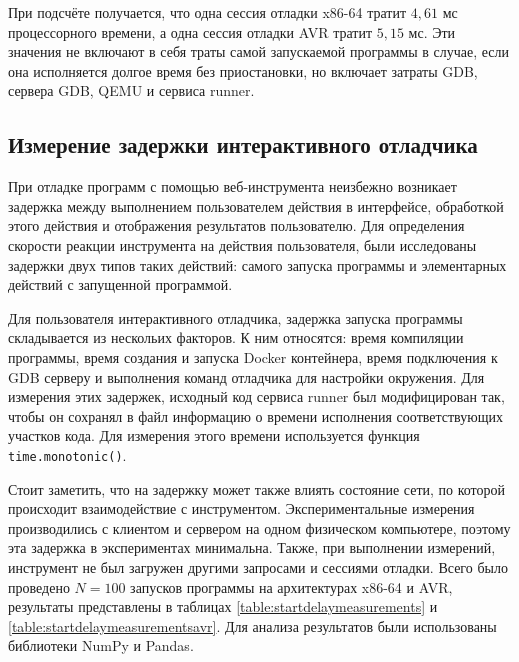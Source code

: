 \documentclass[a4paper,article,14pt]{extarticle}
\begin{document}
При подсчёте получается, что одна сессия отладки x86-64 тратит $4{,}61$ мс процессорного времени, а одна сессия отладки AVR тратит $5{,}15$ мс. Эти значения не включают в себя траты самой запускаемой программы в случае, если она исполняется долгое время без приостановки, но включает затраты GDB, сервера GDB, QEMU и сервиса runner.

\subsection{Измерение задержки интерактивного отладчика}

При отладке программ с помощью веб-инструмента неизбежно возникает задержка между выполнением пользователем действия в интерфейсе, обработкой этого действия и отображения результатов пользователю. Для определения скорости реакции инструмента на действия пользователя, были исследованы задержки двух типов таких действий: самого запуска программы и элементарных действий с запущенной программой.

Для пользователя интерактивного отладчика, задержка запуска программы складывается из нескольих факторов. К ним относятся: время компиляции программы, время создания и запуска Docker контейнера, время подключения к GDB серверу и выполнения команд отладчика для настройки окружения. Для измерения этих задержек, исходный код сервиса runner был модифицирован так, чтобы он сохранял в файл информацию о времени исполнения соответствующих участков кода. Для измерения этого времени используется функция \texttt{time.monotonic()}.

Стоит заметить, что на задержку может также влиять состояние сети, по которой происходит взаимодействие с инструментом. Экспериментальные измерения производились с клиентом и сервером на одном физическом компьютере, поэтому эта задержка в экспериментах минимальна. Также, при выполнении измерений, инструмент не был загружен другими запросами и сессиями отладки. Всего было проведено $N = 100$ запусков программы на архитектурах x86-64 и AVR, результаты представлены в таблицах \ref{table:startdelaymeasurements} и \ref{table:startdelaymeasurementsavr}. Для анализа результатов были использованы библиотеки NumPy и Pandas\cite{pandas}.
\end{document}
